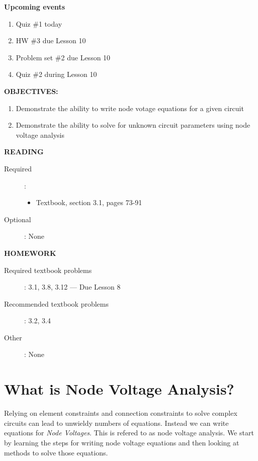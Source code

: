 \documentclass{handout}
\begin{document}
\maketitle

\textbf{Upcoming events}
\begin{enumerate}
\item Quiz \#1 today
\item HW \#3 due Lesson 10
\item Problem set \#2 due Lesson 10
\item Quiz \#2 during Lesson 10
\end{enumerate}

\textbf{OBJECTIVES:}
\begin{enumerate}
\item Demonstrate the ability to write node votage equations for a given circuit
\item Demonstrate the ability to solve for unknown circuit parameters using node voltage analysis
\end{enumerate}

\textbf{READING}
\begin{description}
\item [Required]:
\begin{itemize}
\item  Textbook, section 3.1, pages 73-91
\end{itemize}
\item [Optional]: None
\end{description}

\textbf{HOMEWORK}
\begin{description}
\item [Required textbook problems]: 3.1, 3.8, 3.12 --- Due Lesson 8
\item [Recommended textbook problems]: 3.2, 3.4
\item[Other]: None
\end{description}


\section{What is Node Voltage Analysis?}
Relying on element constraints and connection constraints to solve complex circuits can lead to unwieldy numbers of equations.  Instead we can write equations for {\em Node Voltages}.  This is refered to as node voltage analysis.  We start by learning the steps for writing node voltage equations and then looking at methods to solve those equations.
\end{document}

